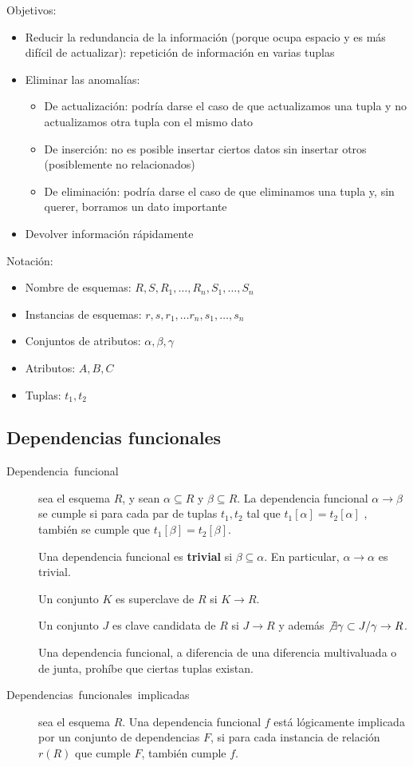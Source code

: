 \documentclass[a4paper, twoside]{article}
\begin{document}
Objetivos:
\begin{itemize}
\item Reducir la redundancia de la información (porque ocupa espacio y es
más difícil de actualizar): repetición de información en varias tuplas
\item Eliminar las anomalías:

\begin{itemize}
\item De actualización: podría darse el caso de que actualizamos una tupla
y no actualizamos otra tupla con el mismo dato
\item De inserción: no es posible insertar ciertos datos sin insertar otros
(posiblemente no relacionados)
\item De eliminación: podría darse el caso de que eliminamos una tupla y,
sin querer, borramos un dato importante
\end{itemize}
\item Devolver información rápidamente
\end{itemize}
Notación:
\begin{itemize}
\item Nombre de esquemas: $R,S,R_{1},\dots,R_{n},S_{1},\dots,S_{n}$
\item Instancias de esquemas: $r,s,r_{1},\dots r_{n},s_{1},\dots,s_{n}$
\item Conjuntos de atributos: $\alpha,\beta,\gamma$
\item Atributos: $A,B,C$
\item Tuplas: $t_{1},t_{2}$
\end{itemize}

\subsection{Dependencias funcionales}
\begin{description}
\item [{Dependencia~funcional}] sea el esquema $R$, y sean $\alpha\subseteq R$
y $\beta\subseteq R$. La dependencia funcional $\alpha\to\beta$
se cumple si para cada par de tuplas $t_{1},t_{2}$ tal que $t_{1}[\alpha]=t_{2}[\alpha]$
, también se cumple que $t_{1}[\beta]=t_{2}[\beta]$. 


Una dependencia funcional es \textbf{trivial} si $\beta\subseteq\alpha$.
En particular, $\alpha\to\alpha$ es trivial.


Un conjunto $K$ es superclave de $R$ si $K\to R$.


Un conjunto $J$ es clave candidata de $R$ si $J\to R$ y además
$\not\exists\gamma\subset J/\gamma\to R$.


Una dependencia funcional, a diferencia de una diferencia multivaluada
o de junta, prohíbe que ciertas tuplas existan.

\item [{Dependencias~funcionales~implicadas}] sea el esquema $R$. Una
dependencia funcional $f$ está lógicamente implicada por un conjunto
de dependencias $F$, si para cada instancia de relación $r(R)$ que
cumple $F$, también cumple $f$.
\end{description}
\end{document}
